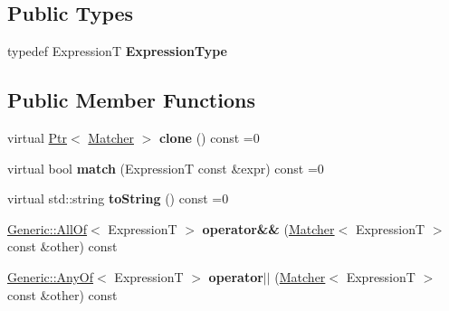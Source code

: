 \subsection*{Public Types}
\begin{DoxyCompactItemize}
\item 
typedef ExpressionT {\bfseries Expression\+Type}\hypertarget{structCatch_1_1Matchers_1_1Impl_1_1Matcher_a7f5068cbacd1eed06cf243e63446e7e1}{}\label{structCatch_1_1Matchers_1_1Impl_1_1Matcher_a7f5068cbacd1eed06cf243e63446e7e1}

\end{DoxyCompactItemize}
\subsection*{Public Member Functions}
\begin{DoxyCompactItemize}
\item 
virtual \hyperlink{classCatch_1_1Ptr}{Ptr}$<$ \hyperlink{structCatch_1_1Matchers_1_1Impl_1_1Matcher}{Matcher} $>$ {\bfseries clone} () const =0\hypertarget{structCatch_1_1Matchers_1_1Impl_1_1Matcher_a9d31e5018fea24efa08c3cbf5aa4475d}{}\label{structCatch_1_1Matchers_1_1Impl_1_1Matcher_a9d31e5018fea24efa08c3cbf5aa4475d}

\item 
virtual bool {\bfseries match} (ExpressionT const \&expr) const =0\hypertarget{structCatch_1_1Matchers_1_1Impl_1_1Matcher_a8c1c5511ce1f3738a45e6901b558f583}{}\label{structCatch_1_1Matchers_1_1Impl_1_1Matcher_a8c1c5511ce1f3738a45e6901b558f583}

\item 
virtual std\+::string {\bfseries to\+String} () const =0\hypertarget{structCatch_1_1Matchers_1_1Impl_1_1Matcher_a091bcc37e589967d7e10fc7790d820e2}{}\label{structCatch_1_1Matchers_1_1Impl_1_1Matcher_a091bcc37e589967d7e10fc7790d820e2}

\item 
\hyperlink{classCatch_1_1Matchers_1_1Impl_1_1Generic_1_1AllOf}{Generic\+::\+All\+Of}$<$ ExpressionT $>$ {\bfseries operator\&\&} (\hyperlink{structCatch_1_1Matchers_1_1Impl_1_1Matcher}{Matcher}$<$ ExpressionT $>$ const \&other) const \hypertarget{structCatch_1_1Matchers_1_1Impl_1_1Matcher_a1d3b73f684611a6a71396caf74427287}{}\label{structCatch_1_1Matchers_1_1Impl_1_1Matcher_a1d3b73f684611a6a71396caf74427287}

\item 
\hyperlink{classCatch_1_1Matchers_1_1Impl_1_1Generic_1_1AnyOf}{Generic\+::\+Any\+Of}$<$ ExpressionT $>$ {\bfseries operator$\vert$$\vert$} (\hyperlink{structCatch_1_1Matchers_1_1Impl_1_1Matcher}{Matcher}$<$ ExpressionT $>$ const \&other) const \hypertarget{structCatch_1_1Matchers_1_1Impl_1_1Matcher_a2e163b264811ba76638469b537467f9e}{}\label{structCatch_1_1Matchers_1_1Impl_1_1Matcher_a2e163b264811ba76638469b537467f9e}


\end{DoxyCompactItemize}
